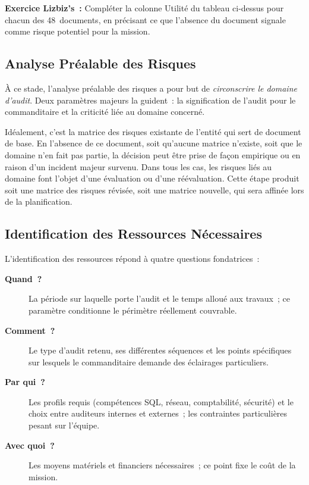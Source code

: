\begin{boxlizbiz}
\textbf{Exercice Lizbiz's~:}
Compléter la colonne \og{}Utilité\fg{} du tableau ci-dessus pour chacun des
48~documents, en précisant ce que l'absence du document signale comme risque
potentiel pour la mission.
\end{boxlizbiz}

\subsection{Analyse Préalable des Risques}
\label{subsec:analyse-prealable-risques}

À ce stade, l'analyse préalable des risques a pour but de \emph{circonscrire le domaine
d'audit}. Deux paramètres majeurs la guident~: la signification de l'audit pour le
commanditaire et la criticité liée au domaine concerné.

Idéalement, c'est la matrice des risques existante de l'entité qui sert de document
de base. En l'absence de ce document, soit qu'aucune matrice n'existe, soit que le
domaine n'en fait pas partie, la décision peut être prise de façon empirique ou en
raison d'un incident majeur survenu. Dans tous les cas, les risques liés au domaine
font l'objet d'une évaluation ou d'une réévaluation. Cette étape produit soit une
matrice des risques révisée, soit une matrice nouvelle, qui sera affinée lors de la
planification.

\subsection{Identification des Ressources Nécessaires}
\label{subsec:identification-ressources}

L'identification des ressources répond à quatre questions fondatrices~:

\begin{description}
    \item[\textbf{Quand~?}] La période sur laquelle porte l'audit et le temps
        alloué aux travaux~; ce paramètre conditionne le périmètre réellement
        couvrable.
    \item[\textbf{Comment~?}] Le type d'audit retenu, ses différentes séquences
        et les points spécifiques sur lesquels le commanditaire demande des
        éclairages particuliers.
    \item[\textbf{Par qui~?}] Les profils requis (compétences SQL, réseau,
        comptabilité, sécurité) et le choix entre auditeurs internes et
        externes~; les contraintes particulières pesant sur l'équipe.
    \item[\textbf{Avec quoi~?}] Les moyens matériels et financiers nécessaires~;
        ce point fixe le coût de la mission.
\end{description}

